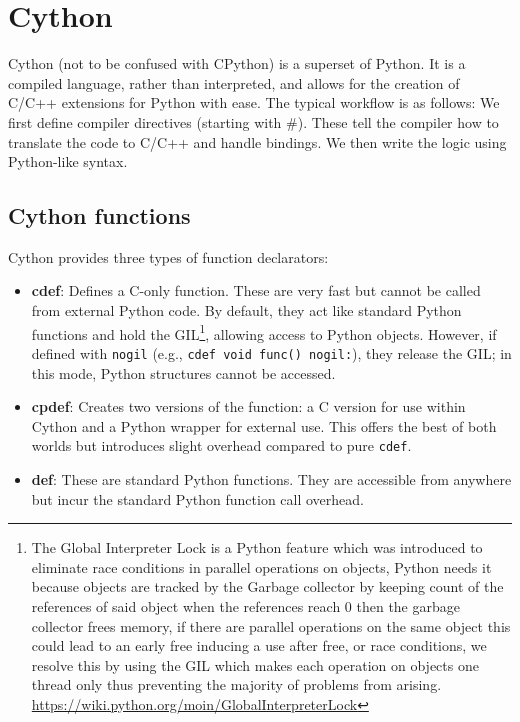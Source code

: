 \documentclass[english,noexaminfo,a4paper,oneside, binding = 0.6cm]{sapthesis}
\begin{document}
\section{Cython}
Cython (not to be confused with CPython) is a superset of Python. It is a compiled language, rather than interpreted, and allows for the creation of C/C++ extensions for Python with ease.
The typical workflow is as follows:
We first define compiler directives (starting with \#). These tell the compiler how to translate the code to C/C++ and handle bindings. We then write the logic using Python-like syntax.

\subsection{Cython functions}
Cython provides three types of function declarators:

\begin{itemize}
  \item \textbf{cdef}: Defines a C-only function. These are very fast but cannot be called from external Python code. By default, they act like standard Python functions and hold the GIL\footnote{The Global Interpreter Lock is a Python feature which was introduced to eliminate race conditions in parallel operations on objects, Python needs it because objects are tracked by the Garbage collector by keeping count of the references of said object when the references reach 0 then the garbage collector frees memory, if there are parallel operations on the same object this could lead to an early free inducing a use after free, or race conditions, we resolve this by using the GIL which makes each operation on objects one thread only thus preventing the majority of problems from arising. \url{https://wiki.python.org/moin/GlobalInterpreterLock}}, allowing access to Python objects. However, if defined with \texttt{nogil} (e.g., \texttt{cdef void func() nogil:}), they release the GIL; in this mode, Python structures cannot be accessed.
    
    \item \textbf{cpdef}: Creates two versions of the function: a C version for use within Cython and a Python wrapper for external use. This offers the best of both worlds but introduces slight overhead compared to pure \texttt{cdef}.
    
    \item \textbf{def}: These are standard Python functions. They are accessible from anywhere but incur the standard Python function call overhead.
\end{itemize}
\end{document}
